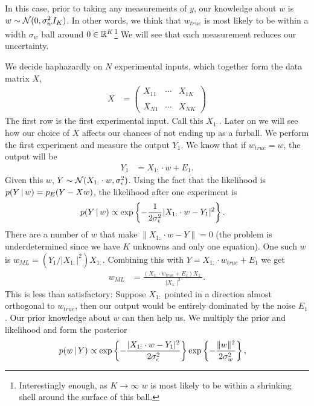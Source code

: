 In this case, prior to taking any measurements of $y$, our knowledge about $w$ is $w\sim{\mathcal N}(0,\sigma_w^2I_K)$.  In other words, we think that $w_{true}$ is most likely to be within a width $\sigma_w$ ball around $0\in{\mathbb R}^K$\footnote{Interestingly enough, as $K\to\infty$ $w$ is most likely to be within a shrinking shell around the surface of this ball.}   We will see that each measurement reduces our uncertainty.  

We decide haphazardly on $N$ experimental inputs, which together form the data matrix $X$,
\begin{align*}
  X &= \left( 
  \begin{matrix}
    X_{11} &\cdots & X_{1K}\\
    & &\\
    X_{N1} & \cdots & X_{NK}
  \end{matrix}
  \right)
\end{align*}
The first row is the first experimental input.  Call this $X_{1:}$. Later on we will see how our choice of $X$ affects our chances of not ending up as a furball.  We perform the first experiment and measure the output $Y_1$.  We know that if $w_{true}=w$, the output will be
\begin{align*}
  Y_1 &= X_{1:}\cdot w + E_1.
\end{align*}
Given this $w$, $Y\sim{\mathcal N}(X_{1:}\cdot w, \sigma^2_{\epsilon})$.  Using the fact that the likelihood is $p(Y{\,|\,} w) = p_E(Y-Xw)$, 
the likelihood after one experiment is
\begin{align*}
  p(Y{\,|\,} w) &\propto \exp\left\{ -\frac{1}{2\sigma_{\epsilon}^2}|X_{1:}\cdot w - Y_1|^2 \right\}.
\end{align*}
There are a number of $w$ that make $\|X_{1:}\cdot w - Y\|=0$ (the problem is underdetermined since we have $K$ unknowns and only one equation).  One such $w$ is $w_{ML} = (Y_1/|X_{1:}|^2)X_{1:}$.  Combining this with $Y=X_{1:}\cdot w_{true} + E_1$ we get
\begin{align*}
  w_{ML} &= \frac{(X_{1:}\cdot w_{true} + E_1)X_{1:}}{|X_{1:}|^2}.
\end{align*}
This is less than satisfactory:  Suppose $X_{1:}$ pointed in a direction almost orthogonal to $w_{true}$, then our output would be entirely dominated by the noise $E_1$.  Our prior knowledge about $w$ can then help us.  We multiply the prior and likelihood and form the posterior
\begin{align*}
  p(w{\,|\,} Y) &\propto \exp\left\{ -\frac{|X_{1:}\cdot w - Y_1|^2}{2\sigma_{\epsilon}^2}\right\} \exp\left\{-\frac{\|w\|^2}{2\sigma_w^2} \right\},
\end{align*}
